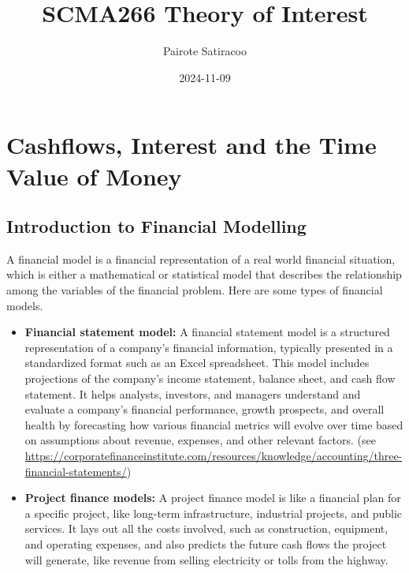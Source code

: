 \documentclass[
]{book}
\title{SCMA266 Theory of Interest}
\author{Pairote Satiracoo}
\date{2024-11-09}
\providecommand{\tightlist}{%
  \setlength{\itemsep}{0pt}\setlength{\parskip}{0pt}}
\theoremstyle{definition}
\theoremstyle{definition}
\theoremstyle{definition}
\theoremstyle{definition}
\theoremstyle{remark}
\begin{document}
\maketitle

{
\setcounter{tocdepth}{1}
\tableofcontents
}
\chapter{Cashflows, Interest and the Time Value of Money}\label{cashflows-interest-and-the-time-value-of-money}

\section{Introduction to Financial Modelling}\label{introduction-to-financial-modelling}

A financial model is a financial representation of a real world
financial situation, which is either a mathematical or statistical model
that describes the relationship among the variables of the financial
problem. Here are some types of financial models.

\begin{itemize}
\tightlist
\item
  \textbf{Financial statement model:} A financial statement model is a structured representation of a company's financial information, typically presented in a standardized format such as an Excel spreadsheet. This model includes projections of the company's income statement, balance sheet, and cash flow statement. It helps analysts, investors, and managers understand and evaluate a company's financial performance, growth prospects, and overall health by forecasting how various financial metrics will evolve over time based on assumptions about revenue, expenses, and other relevant factors. (see
  \url{https://corporatefinanceinstitute.com/resources/knowledge/accounting/three-financial-statements/})
\end{itemize}

\begin{itemize}
\tightlist
\item
  \textbf{Project finance models:} A project finance model is like a financial plan for a specific project, like long-term infrastructure, industrial projects, and public services. It lays out all the costs involved, such as construction, equipment, and operating expenses, and also predicts the future cash flows the project will generate, like revenue from selling electricity or tolls from the highway.
\end{itemize}
\end{document}
